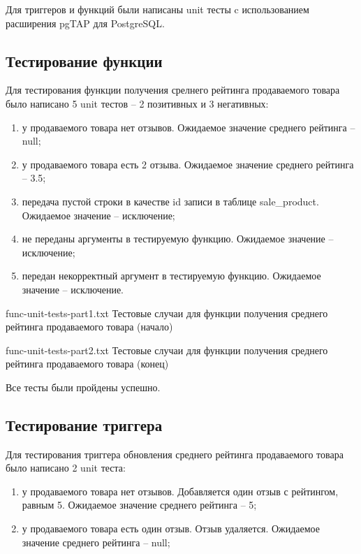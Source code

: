 Для триггеров и функций были написаны unit тесты \cite{info_unit_tests} c использованием расширения pgTAP \cite{info_pgTAB} для PostgreSQL.

\subsection{Тестирование функции}

Для тестирования функции получения срелнего рейтинга продаваемого товара было написано 5 unit тестов -- 2 позитивных и 3 негативных:

\begin{enumerate}
	\item у продаваемого товара нет отзывов. Ожидаемое значение среднего рейтинга -- null;
	\item у продаваемого товара есть 2 отзыва. Ожидаемое значение среднего рейтинга -- 3.5;
	\item передача пустой строки в качестве id записи в таблице sale\_product. Ожидаемое значение -- исключение;
	\item не переданы аргументы в тестируемую функцию. Ожидаемое значение -- исключение;
	\item передан некорректный аргумент в тестируемую функцию. Ожидаемое значение -- исключение.
\end{enumerate}

{func-unit-tests-part1.txt} %
{Тестовые случаи для функции получения среднего рейтинга продаваемого товара (начало)} %

{func-unit-tests-part2.txt} %
{Тестовые случаи для функции получения среднего рейтинга продаваемого товара (конец)} %

Все тесты были пройдены успешно.

\clearpage

\subsection{Тестирование триггера}

Для тестирования триггера обновления среднего рейтинга продаваемого товара было написано 2 unit теста:

\begin{enumerate}
	\item у продаваемого товара нет отзывов. Добавляется один отзыв с рейтингом, равным 5. Ожидаемое значение среднего рейтинга -- 5;
	\item у продаваемого товара есть один отзыв. Отзыв удаляется. Ожидаемое значение среднего рейтинга -- null;
\end{enumerate}

